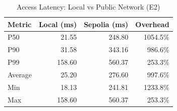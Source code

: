 \begin{table}[h]
\centering
\caption{Access Latency: Local vs Public Network (E2)}
\label{tab:e2-latency}
\begin{tabular}{lrrr}
\toprule
\textbf{Metric} & \textbf{Local (ms)} & \textbf{Sepolia (ms)} & \textbf{Overhead} \\
\midrule
P50 & 21.55 & 248.80 & 1054.5\% \\
P90 & 31.58 & 343.16 & 986.6\% \\
P99 & 158.60 & 560.37 & 253.3\% \\
Average & 25.20 & 276.60 & 997.6\% \\
Min & 18.13 & 241.81 & 1233.8\% \\
Max & 158.60 & 560.37 & 253.3\% \\
\bottomrule
\end{tabular}
\end{table}
